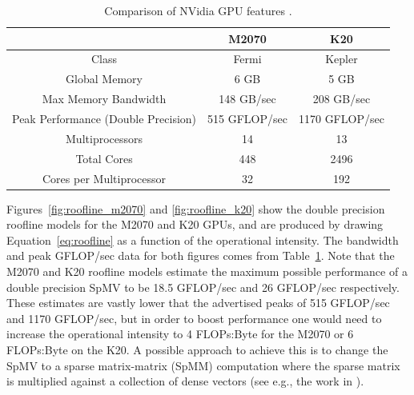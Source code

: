\documentclass{report}
\begin{document}
\begin{table}[t]
\centering
\caption{Comparison of NVidia GPU features \cite{M2070FactSheet,KeplerFactSheet}.}
\label{tbl:gpu_comparison}
\begin{tabular}{c|c|c}
 & M2070  & K20 \\ \hline
Class & Fermi & Kepler \\ \hline
Global Memory & 6 GB & 5 GB \\ 
Max Memory Bandwidth & 148 GB/sec & 208 GB/sec \\ 
Peak Performance (Double Precision) & 515 GFLOP/sec & 1170 GFLOP/sec \\ 
Multiprocessors & 14 & 13 \\ 
Total Cores & 448 & 2496 \\ 
Cores per Multiprocessor & 32 & 192 \\ \hline
\end{tabular}
\end{table}

Figures~\ref{fig:roofline_m2070} and \ref{fig:roofline_k20} show the double precision roofline models for the M2070 and K20 GPUs, and are produced by drawing Equation~\ref{eq:roofline} as a function of the operational intensity. The bandwidth and peak GFLOP/sec data for both figures comes from Table~\ref{tbl:gpu_comparison}. Note that the M2070 and K20 roofline models estimate the maximum possible performance of a double precision SpMV to be 18.5 GFLOP/sec and 26 GFLOP/sec respectively. These estimates are vastly lower that the advertised peaks of 515 GFLOP/sec and 1170 GFLOP/sec, but in order to boost performance one would need to increase the operational intensity to 4 FLOPs:Byte for the M2070 or 6 FLOPs:Byte on the K20. A possible approach to achieve this is to change the SpMV to a sparse matrix-matrix (SpMM) computation where the sparse matrix is multiplied against a collection of dense vectors (see e.g., the work in \cite{ErlebacherSauleFlyerBollig2013}). 
\end{document}
